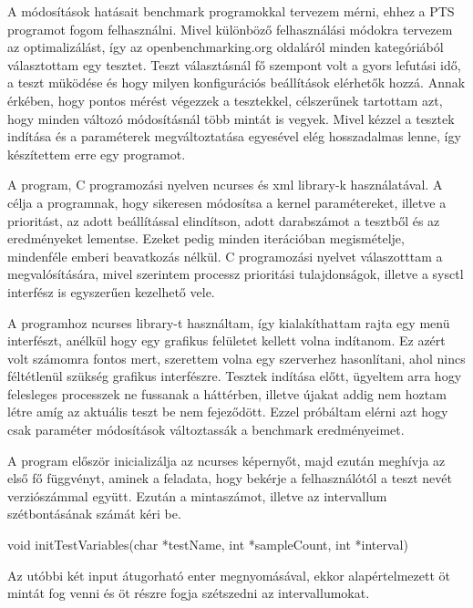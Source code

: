 A módosítások hatásait benchmark programokkal tervezem mérni, ehhez a PTS programot fogom felhasználni. Mivel különböző felhasználási módokra tervezem az optimalizálást, így az openbenchmarking.org oldaláról minden kategóriából választottam egy tesztet. 
Teszt választásnál fő szempont volt a gyors lefutási idő, a teszt müködése és hogy milyen konfigurációs beállítások elérhetők hozzá. Annak érkében, hogy pontos mérést végezzek a tesztekkel, célszerűnek tartottam azt, hogy minden változó módosításnál több mintát is vegyek.
Mivel kézzel a tesztek indítása és a paraméterek megváltoztatása egyesével elég hosszadalmas lenne, így készítettem erre egy programot.


A program, C programozási nyelven ncurses és xml library-k használatával.
A célja a programnak, hogy sikeresen módosítsa a kernel paramétereket, illetve a prioritást, az adott beállítással elindítson, adott darabszámot a tesztből és az eredményeket lementse. Ezeket pedig minden iterációban megismételje, mindenféle emberi beavatkozás nélkül.
C programozási nyelvet válaszotttam a megvalósítására, mivel szerintem  processz prioritási tulajdonságok, illetve a sysctl interfész is egyszerűen kezelhető vele.

A programhoz ncurses library-t használtam, így kialakíthattam rajta egy menü interfészt, anélkül hogy egy grafikus felületet kellett volna indítanom. Ez azért volt számomra fontos mert, szerettem volna egy szerverhez hasonlítani, ahol nincs féltétlenül szükség grafikus interfészre. Tesztek indítása előtt, ügyeltem arra hogy felesleges processzek ne fussanak a háttérben, illetve újakat addig nem hoztam létre amíg az aktuális teszt be nem fejeződött. Ezzel próbáltam elérni azt hogy csak paraméter módosítások változtassák a benchmark eredményeimet.


A program először inicializálja az ncurses képernyőt, majd ezután meghívja az első fő függvényt, aminek a feladata, hogy bekérje a felhasználótól a teszt nevét verziószámmal együtt. Ezután a mintaszámot, illetve az intervallum szétbontásának számát kéri be.  

\begin{cpp}
void initTestVariables(char *testName, int *sampleCount, int *interval)
\end{cpp}

Az utóbbi két input átugorható enter megnyomásával, ekkor alapértelmezett öt mintát fog venni és öt részre fogja szétszedni az intervallumokat.

